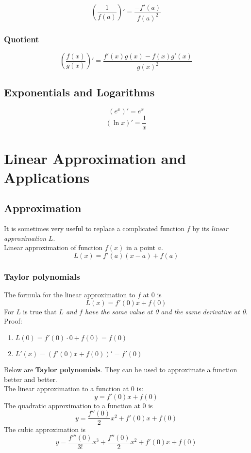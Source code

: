 \documentclass[12pt, a4paper]{scrartcl}
\begin{document}
$$(\dfrac{1}{f(a)})' = \dfrac{-f'(a)}{f(a)^2}$$

\subsubsection{Quotient}
\label{sec:derivatives:computing:quotient}

$$(\dfrac{f(x)}{g(x)})'=\dfrac{f'(x)g(x) - f(x)g'(x)}{g(x)^2}$$

\subsection{Exponentials and Logarithms}
\label{sec:derivatives:exp}
$$(e^x)' = e^x$$
$$(\ln x)' = \dfrac{1}{x}$$

\section{Linear Approximation and Applications}
\label{sec:applications}

\subsection{Approximation}
\label{sec:application:approximation}

It is sometimes very useful to replace a complicated function $f$ by its \textit{linear approximation} $L$.\\
Linear approximation of function $f(x)$ in a point $a$.
$$L(x) = f'(a)(x-a) + f(a)$$

\subsubsection{Taylor polynomials}
\label{sec:application:approximation:taylor_polynomials}
The formula for the linear approximation to $f$ at 0 is $$L(x) = f'(0)x + f(0)$$
For $L$ is true that \textit{$L$ and $f$ have the same value at 0 and the same derivative at 0}.\\
Proof: \begin{enumerate}
    \item $L(0) = f'(0) \cdot 0 + f(0) = f(0)$
    \item $L'(x) = (f'(0)x + f(0))' = f'(0)$
\end{enumerate}
Below are \textbf{Taylor polynomials}. They can be used to approximate a function better and better.\\
The linear approximation to a function at 0 is: $$y=f'(0)x + f(0)$$
The quadratic approximation to a function at 0 is $$y=\dfrac{f''(0)}{2}x^2 + f'(0)x + f(0)$$
The cubic approximation is $$y = \dfrac{f'''(0)}{3!}x^3 + \dfrac{f''(0)}{2}x^2 + f'(0)x + f(0)$$
\end{document}
